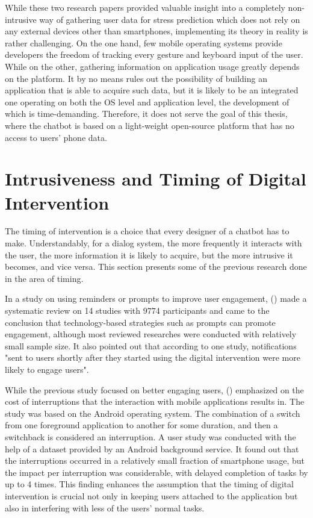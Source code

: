 While these two research papers provided valuable insight into a completely non-intrusive way of gathering user data for stress prediction which does not rely on any external devices other than smartphones, implementing its theory in reality is rather challenging. On the one hand, few mobile operating systems provide developers the freedom of tracking every gesture and keyboard input of the user. While on the other, gathering information on application usage greatly depends on the platform. It by no means rules out the possibility of building an application that is able to acquire such data, but it is likely to be an integrated one operating on both the OS level and application level, the development of which is time-demanding. Therefore, it does not serve the goal of this thesis, where the chatbot is based on a light-weight open-source platform that has no access to users' phone data.

\section{Intrusiveness and Timing of Digital Intervention}\label{section:timing}
The timing of intervention is a choice that every designer of a chatbot has to make. Understandably, for a dialog system, the more frequently it interacts with the user, the more information it is likely to acquire, but the more intrusive it becomes, and vice versa. This section presents some of the previous research done in the area of timing.\bigskip

\noindent In a study on using reminders or prompts to improve user engagement, \citeauthor{25_timing_review} (\citeyear{25_timing_review}) made a systematic review on 14 studies with 9774 participants and came to the conclusion that technology-based strategies such as prompts can promote engagement, although most reviewed researches were conducted with relatively small sample size. It also pointed out that according to one study, notifications "sent to users shortly after they started using the digital intervention were more likely to engage users".\bigskip

\noindent While the previous study focused on better engaging users, \citeauthor{26_cost_interruption} (\citeyear{26_cost_interruption}) emphasized on the cost of interruptions that the interaction with mobile applications results in. The study was based on the Android operating system. The combination of a switch from one foreground application to another for some duration, and then a switchback is considered an interruption. A user study was conducted with the help of a dataset provided by an Android background service. It found out that the interruptions occurred in a relatively small fraction of smartphone usage, but the impact per interruption was considerable, with delayed completion of tasks by up to 4 times. This finding enhances the assumption that the timing of digital intervention is crucial not only in keeping users attached to the application but also in interfering with less of the users' normal tasks.\bigskip

